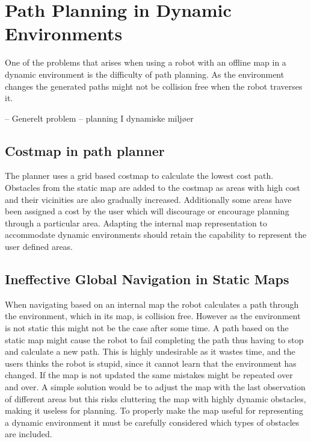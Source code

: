 \section{Path Planning in Dynamic Environments}
One of the problems that arises when using a robot with an  offline map in a dynamic environment is the difficulty of path planning.
As the environment changes the generated paths might not be collision free when the robot traverses it. 

–	Generelt problem – planning I dynamiske miljøer

\subsection{Costmap in path planner}
The planner uses a grid based costmap to calculate the lowest cost path. Obstacles from the static map are added to the costmap as areas with high cost and their vicinities are also gradually increased. 
Additionally some areas have been assigned a cost by the user which will discourage or encourage planning through a particular area. 
Adapting the internal map representation to accommodate dynamic environments should retain the capability to represent the user defined areas.  

\subsection{Ineffective Global Navigation in Static Maps}
When navigating based on an internal map the robot calculates a path through the environment, which in its map, is collision free. 
However as the environment is not static this might not be the case after some time. 
A path based on the static map might cause the robot to fail completing the path thus having to stop and calculate a new path. 
This is highly undesirable as it wastes time, and the users thinks the robot is stupid, since it cannot learn that the environment has changed. 
If the map is not updated the same mistakes might be repeated over and over. 
A simple solution would be to adjust the map with the last observation of different areas but this risks cluttering the map with highly dynamic obstacles, making it useless for planning.
To properly make the map useful for representing a dynamic environment it must be carefully considered which types of obstacles are included. 